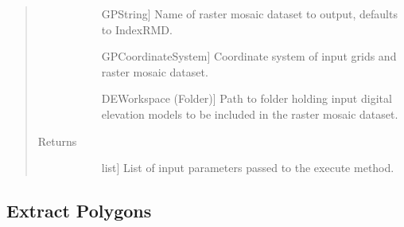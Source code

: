 \documentclass[letterpaper,10pt,english]{sphinxmanual}
\begin{document}
\begin{fulllineitems}
\begin{fulllineitems}
\begin{quote}
\begin{description}
\begin{description}
\item[{}] \leavevmode{[}GPString{]}
Name of raster mosaic dataset to output, defaults to IndexRMD.

\item[{}] \leavevmode{[}GPCoordinateSystem{]}
Coordinate system of input grids and raster mosaic dataset.

\item[{}] \leavevmode{[}DEWorkspace (Folder){]}
Path to folder holding input digital elevation models to be included in the raster mosaic dataset.

\end{description}

\item[{Returns}] \leavevmode\begin{description}
\item[{}] \leavevmode{[}list{]}
List of input parameters passed to the execute method.

\end{description}

\end{description}\end{quote}

\end{fulllineitems}


\end{fulllineitems}



\subsection{Extract Polygons}
\label{\detokenize{StreamStats_DataPrep:extract-polygons}}
\end{document}
